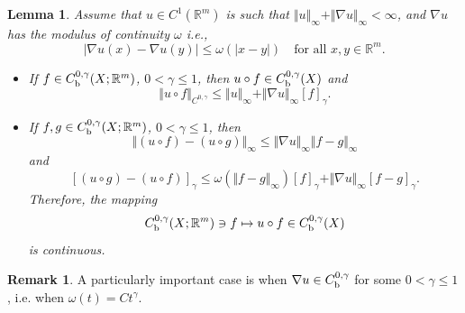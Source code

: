 \documentclass[intlimits,12pt,reqno]{amsart}
\newcommand{\R}{\mathbb R}
\numberwithin{equation}{section}
\newtheorem{lemma}[theorem]{Lemma}
\theoremstyle{definition}
\newtheorem{remark}[theorem]{Remark}
\begin{document}
\begin{lemma}
\label{T30}
Assume that $u\in C^1(\R^m)$ is such that $\Vert u\Vert_\infty+\Vert\nabla u\Vert_\infty<\infty$, and $\nabla u$ has the modulus of continuity $\omega$ i.e.,
$$
|\nabla u(x)-\nabla u(y)|\leq\omega(|x-y|)
\quad\text{for all $x,y\in\R^m$.}
$$
\begin{itemize}
\item[(a)] If $f\in C_{\rm b}^{0,\gamma}(X;\R^m)$, $0<\gamma\leq 1$, then $u\circ f\in C_{\rm b}^{0,\gamma}(X)$ and
$$
\Vert u\circ f\Vert_{C^{0,\gamma}}\leq \Vert u\Vert_\infty+\Vert\nabla u\Vert_\infty [f]_{\gamma}.
$$
\item[(b)] If $f,g\in C^{0,\gamma}_{\rm b}(X;\R^m)$, $0<\gamma\leq 1$, then
$$
\Vert (u\circ f)-(u\circ g)\Vert_\infty\leq \Vert\nabla u\Vert_\infty\Vert f-g\Vert_\infty
$$
and
\begin{equation}
\label{eq23}
[(u\circ g)-(u\circ f)]_{\gamma}\leq\omega(\Vert f-g\Vert_\infty)[f]_{\gamma}+
\Vert\nabla u\Vert_\infty [f-g]_{\gamma}.
\end{equation}
Therefore, the mapping
$$
C^{0,\gamma}_{\rm b}(X;\R^m)\ni f\mapsto u\circ f\in C_{\rm b}^{0,\gamma}(X)
$$
is continuous.
\end{itemize}
\end{lemma}
\begin{remark}
A particularly important case is when 
$\nabla u\in C_{\rm b}^{0,\gamma}$ for some $0<\gamma\leq 1$, i.e. when $\omega(t)=Ct^\gamma$.
\end{remark}
\end{document}
